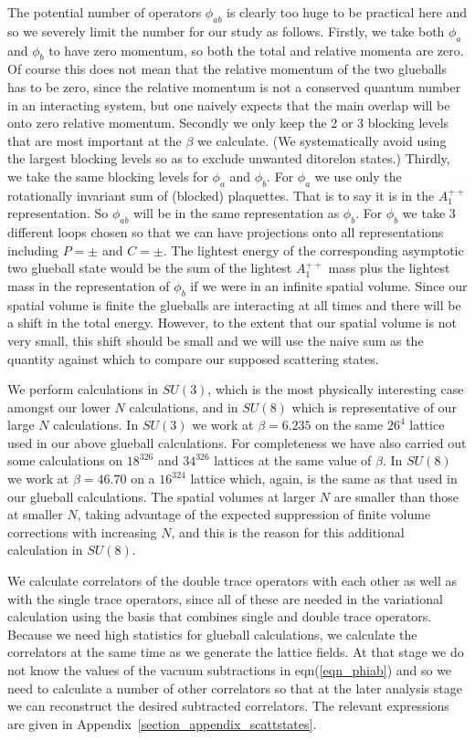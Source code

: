 \documentclass[12pt]{article}
\begin{document}
The potential number of operators $\phi_{ab}$ is clearly too huge to be practical
here and so we severely limit the number for our study as follows. Firstly, we take
both $\phi_a$ and $\phi_b$ to have zero momentum, so both the total and relative
momenta are zero. Of course this does not mean that the relative momentum of the
two glueballs has to be zero, since the relative momentum is not a conserved
quantum number in an interacting system, but one naively expects that the main overlap
will be onto zero relative momentum. Secondly we only keep the 2 or 3 blocking
levels that are most important at the $\beta$ we calculate. (We systematically avoid using
the largest blocking levels so as to exclude unwanted ditorelon states.) Thirdly, we take the
same blocking levels for $\phi_a$ and $\phi_b$. For $\phi_a$ we use only the rotationally
invariant sum of (blocked) plaquettes. That is to say it is in the $A_1^{++}$
representation. So $\phi_{ab}$  will be in the same representation as $\phi_b$. For
$\phi_b$ we take 3 different loops chosen so that we can have projections onto all
representations including $P=\pm$ and $C=\pm$. The lightest energy of the
corresponding asymptotic two glueball state would be the sum of the lightest
$A_1^{++}$ mass plus the lightest mass in the representation of $\phi_b$
if we were in an infinite spatial volume. Since our spatial volume is finite
the glueballs are interacting at all times and there will be a shift in the total
energy. However, to the extent that our spatial volume is not very small, this
shift should be small and we will use the naive sum as the quantity against
which to compare our supposed scattering states.

We perform calculations in $SU(3)$, which is the most physically interesting case
amongst our lower $N$ calculations, and in $SU(8)$ which is representative of our
large $N$ calculations. In $SU(3)$ we work at $\beta=6.235$ on the same $26^4$ lattice
used in our above glueball calculations. For completeness we have also carried out
some calculations on $18^326$ and $34^326$ lattices at the same value of $\beta$.
In $SU(8)$ we work at $\beta=46.70$ on a $16^324$ lattice which, again, is the same
as that used in our glueball calculations. The spatial volumes at larger $N$ are
smaller than those at smaller $N$, taking advantage of the expected suppression of
finite volume corrections with increasing $N$, and this is the reason for this
additional calculation in  $SU(8)$.

We calculate correlators of the double trace operators with each other as
well as with the single trace operators, since all of these are needed in the
variational calculation using the basis that combines single and double trace
operators. Because we need high statistics for glueball calculations, we calculate
the correlators at the same time as we generate the lattice fields. At that stage
we do not know the values of the vacuum subtractions in eqn(\ref{eqn_phiab})
and so we need to calculate a number of other correlators so that at the later
analysis stage we can reconstruct the desired subtracted correlators. The relevant
expressions are given in Appendix~\ref{section_appendix_scattstates}.
\end{document}
